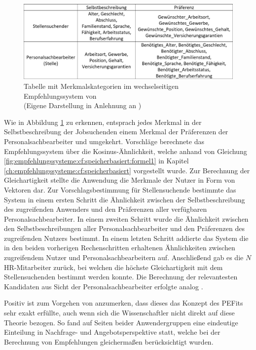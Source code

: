 \begin{figure}[h]
	\centering
	\includegraphics[width=1\textwidth]{gfx/hong-tabelle.png}
	\caption{Tabelle mit Merkmalskategorien im wechselseitigen Empfehlungssystem von \textcite[S. 2]{wenxing:2015}\\
	(Eigene Darstellung in Anlehnung an \cite[S. 2]{wenxing:2015})}
	\label{fig:verwandteArbeiten:nichtAufDemPEFitBasierendeBilateraleSysteme:abb1}
\end{figure}

Wie in Abbildung \ref{fig:verwandteArbeiten:nichtAufDemPEFitBasierendeBilateraleSysteme:abb1} zu erkennen, entsprach jedes Merkmal in der Selbstbeschreibung der Jobsuchenden einem Merkmal der Präferenzen der Personalsachbearbeiter und umgekehrt. Vorschläge berechnete das Empfehlungssystem über die Kosinus-Ähnlichkeit, welche anhand von Gleichung \ref{fig:empfehlungssysteme:cf:speicherbasiert:formel1} in Kapitel \ref{ch:empfehlungssysteme:cf:speicherbasiert} vorgestellt wurde. Zur Berechnung der Gleichartigkeit stellte die Anwendung die Merkmale der Nutzer in Form von Vektoren dar. Zur Vorschlagsbestimmung für Stellensuchende bestimmte das System in einem ersten Schritt die Ähnlichkeit zwischen der Selbstbeschreibung des zugreifenden Anwenders und den Präferenzen aller verfügbaren Personalsachbearbeiter. In einem zweiten Schritt wurde die Ähnlichkeit zwischen den Selbstbeschreibungen aller Personalsachbearbeiter und den Präferenzen des zugreifenden Nutzers bestimmt. In einem letzten Schritt addierte das System die in den beiden vorherigen Rechenschritten erhaltenen Ähnlichkeiten zwischen zugreifendem Nutzer und Personalsachbearbeitern auf. Anschließend gab es die $N$ HR-Mitarbeiter zurück, bei welchen die höchste Gleichartigkeit mit dem Stellensuchenden bestimmt werden konnte. Die Berechnung der relevantesten Kandidaten aus Sicht der Personalsachbearbeiter erfolgte analog \cite[S. 2f.]{wenxing:2015}.

Positiv ist zum Vorgehen von \textcite[S. 1ff.]{wenxing:2015} anzumerken, dass dieses das Konzept des \acp{PEFit} sehr exakt erfüllte, auch wenn sich die Wissenschaftler nicht direkt auf diese Theorie bezogen. So fand auf Seiten beider Anwendergruppen eine eindeutige Einteilung in Nachfrage- und Angebotsperspektive statt, welche bei der Berechnung von Empfehlungen gleichermaßen berücksichtigt wurden.

